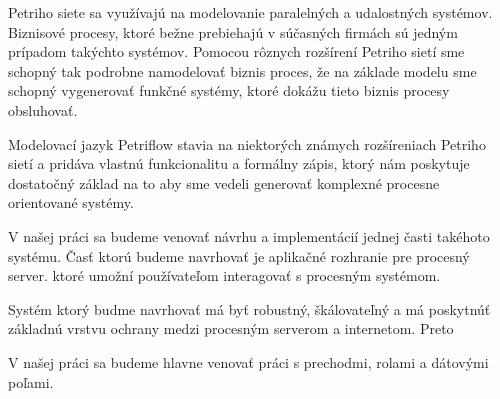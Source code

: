 Petriho siete sa využívajú na modelovanie paralelných a udalostných systémov. Biznisové procesy, ktoré bežne prebiehajú v súčasných firmách sú jedným prípadom takýchto systémov. Pomocou rôznych rozšírení Petriho sietí sme schopný tak podrobne namodelovať biznis proces, že na základe modelu sme schopný vygenerovať funkčné systémy, ktoré dokážu tieto biznis procesy obsluhovať.  

Modelovací jazyk Petriflow stavia na niektorých známych rozšíreniach Petriho sietí a pridáva vlastnú funkcionalitu a formálny zápis, ktorý nám poskytuje dostatočný základ na to aby sme vedeli generovať komplexné procesne orientované systémy. 

V našej práci sa budeme venovať návrhu a implementácií jednej časti takéhoto systému. Časť ktorú budeme navrhovať je aplikačné rozhranie pre procesný server. ktoré umožní používateľom interagovať s procesným systémom. 

Systém ktorý budme navrhovať má byť robustný, škálovateľný a má poskytnúť základnú vrstvu ochrany medzi procesným serverom a internetom. Preto 


V našej práci sa budeme hlavne venovať práci s prechodmi, rolami a  dátovými poľami. 
